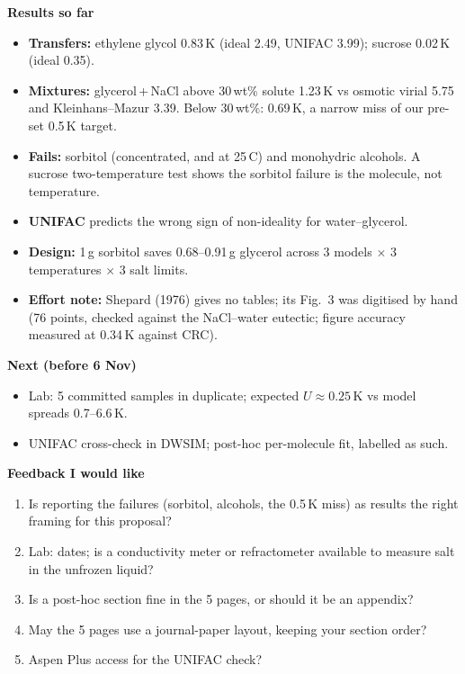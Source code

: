 \documentclass[10pt,a4paper]{article}
\begin{document}
\vspace{3pt}
\begin{minipage}[t]{0.52\textwidth}
\textbf{Results so far}
\begin{itemize}
\item \textbf{Transfers:} ethylene glycol 0.83\,K (ideal 2.49, UNIFAC 3.99); sucrose 0.02\,K (ideal 0.35).
\item \textbf{Mixtures:} glycerol\,+\,NaCl above 30\,wt\% solute 1.23\,K vs osmotic virial 5.75 and Kleinhans--Mazur 3.39.
Below 30\,wt\%: 0.69\,K, a narrow miss of our pre-set 0.5\,K target.
\item \textbf{Fails:} sorbitol (concentrated, and at 25\,\textdegree C) and monohydric alcohols. A sucrose two-temperature test shows the
sorbitol failure is the molecule, not temperature.
\item \textbf{UNIFAC} predicts the wrong sign of non-ideality for water--glycerol.
\item \textbf{Design:} 1\,g sorbitol saves 0.68--0.91\,g glycerol across 3 models $\times$ 3 temperatures $\times$ 3 salt limits.
\item \textbf{Effort note:} Shepard (1976) gives no tables; its Fig.\ 3 was digitised by hand (76 points, checked against the
NaCl--water eutectic; figure accuracy measured at 0.34\,K against CRC).
\end{itemize}
\end{minipage}\hfill
\begin{minipage}[t]{0.45\textwidth}
\textbf{Next (before 6 Nov)}
\begin{itemize}
\item Lab: 5 committed samples in duplicate; expected $U \approx 0.25$\,K vs model spreads 0.7--6.6\,K.
\item UNIFAC cross-check in DWSIM; post-hoc per-molecule fit, labelled as such.
\end{itemize}
\textbf{Feedback I would like}
\begin{enumerate}
\item Is reporting the failures (sorbitol, alcohols, the 0.5\,K miss) as results the right framing for this proposal?
\item Lab: dates; is a conductivity meter or refractometer available to measure salt in the unfrozen liquid?
\item Is a post-hoc section fine in the 5 pages, or should it be an appendix?
\item May the 5 pages use a journal-paper layout, keeping your section order?
\item Aspen Plus access for the UNIFAC check?
\end{enumerate}
\end{minipage}
\end{document}
